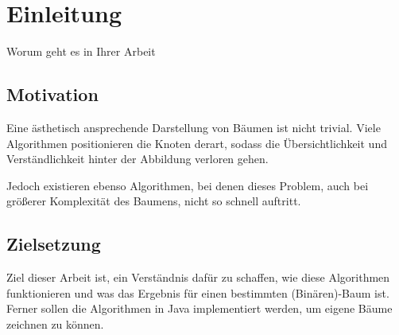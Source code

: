 \chapter{Einleitung}
\label{chap:einleitung}
Worum geht es in Ihrer Arbeit

\section{Motivation}
\label{sec:motivation}
Eine ästhetisch ansprechende Darstellung von Bäumen ist nicht trivial.
Viele Algorithmen positionieren die Knoten derart, sodass die Übersichtlichkeit
und Verständlichkeit hinter der Abbildung verloren gehen.

Jedoch existieren ebenso Algorithmen, bei denen dieses Problem, auch bei größerer
Komplexität des Baumens, nicht so schnell auftritt.

\section{Zielsetzung}
\label{sec:zielsetzung}
Ziel dieser Arbeit ist, ein Verständnis dafür zu schaffen, wie diese Algorithmen funktionieren
und was das Ergebnis für einen bestimmten (Binären)-Baum ist. Ferner sollen die
Algorithmen in Java implementiert werden, um eigene Bäume zeichnen zu können.
